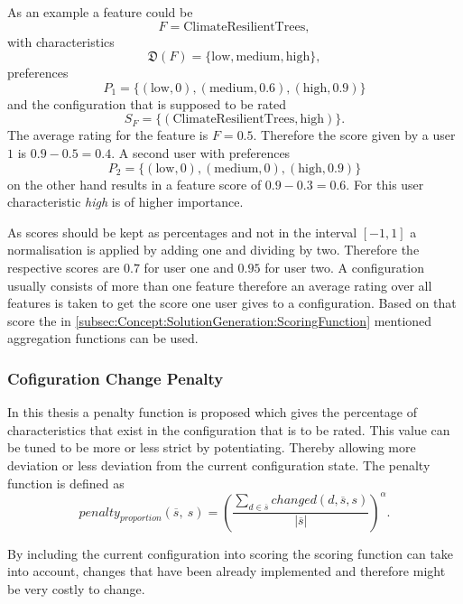 As an example a feature could be
\begin{equation}
    F = \text{ClimateResilientTrees},
\end{equation} with characteristics
\begin{equation}
    \mathfrak{D}(F)= \{\text{low}, \text{medium}, \text{high}\},
\end{equation}
preferences
\begin{equation}
    P_1 = \{(\text{low}, 0), (\text{medium},0.6), (\text{high},0.9) \}
\end{equation} 
and the configuration that is supposed to be rated
\begin{equation}
    S_F = \{(\text{ClimateResilientTrees}, \text{high})\}.
\end{equation}
The average rating for the feature is $F = 0.5$. Therefore the score given by a user $1$ is $0.9-0.5 = 0.4$.
A second user with preferences 
\begin{equation}
    P_2 = \{(\text{low}, 0), (\text{medium},0), (\text{high},0.9) \}
\end{equation} 
on the other hand results in a feature score of $0.9-0.3=0.6$. For this user characteristic \emph{high} is of higher importance.

As scores should be kept as percentages and not in the interval $[-1,1]$ a normalisation is applied by adding one and dividing by two. Therefore the respective scores are $0.7$ for user one and $0.95$ for user two. A configuration usually consists of more than one feature therefore an average rating over all features is taken to get the score one user gives to a configuration. Based on that score the in \autoref{subsec:Concept:SolutionGeneration:ScoringFunction} mentioned aggregation functions can be used.

\subsubsection{Cofiguration Change Penalty}

In this thesis a penalty function is proposed which gives the percentage of characteristics that exist in the configuration that is to be rated. This value can be tuned to be more or less strict by potentiating. Thereby allowing more deviation or less deviation from the current configuration state. The penalty function is defined as
\begin{equation}
    penalty_{proportion}(\overline{s},\ s) =  \left(\frac{\sum_{d \in \overline{s}} changed(d,\overline{s}, s)}{|\overline{s}|}\right)^\alpha.
\end{equation}

By including the current configuration into scoring the scoring function can take into account, changes that have been already implemented and therefore might be very costly to change.
    
